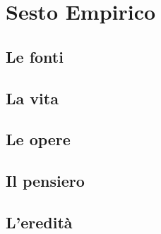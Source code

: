 \chapter{Sesto Empirico}

\section{Le fonti}

\section{La vita}

\section{Le opere}

\section{Il pensiero}

\section{L'eredità}
